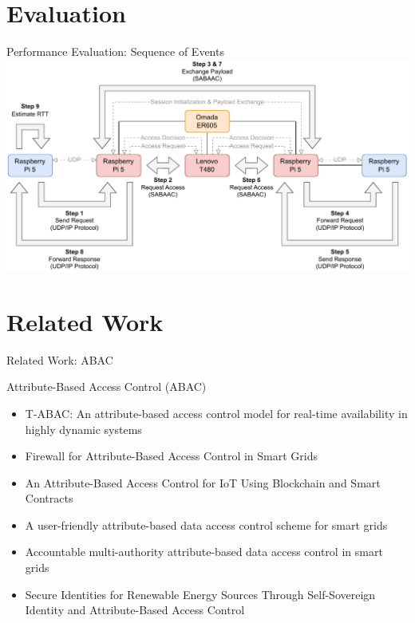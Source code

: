 \documentclass[en]{sdqbeamer}
\begin{document}
\section{Evaluation}
\begin{frame}{Performance Evaluation: Sequence of Events}
    \centering
    \includegraphics[height=0.75\textheight]{figures/performance_evaluation_steps.drawio.pdf}
\end{frame}

\section{Related Work}
\begin{frame}{Related Work: ABAC}
    \begin{blueblock}{Attribute-Based Access Control (ABAC)}
        \begin{itemize}
            \item T-ABAC: An attribute-based access control model for real-time availability in highly dynamic systems \parencite{Burmester2013}
            \item Firewall for Attribute-Based Access Control in Smart Grids \parencite{Ruland2018}
            \item An Attribute-Based Access Control for IoT Using Blockchain and Smart Contracts \parencite{Zaidi2021}
            \item A user-friendly attribute-based data access control scheme for smart grids \parencite{Mu2023}
            \item Accountable multi-authority attribute-based data access control in smart grids \parencite{Zhang2023}
            \item Secure Identities for Renewable Energy Sources Through Self-Sovereign Identity and Attribute-Based Access Control \parencite{Volkmann2024}
        \end{itemize}
    \end{blueblock}
\end{frame}
\end{document}

